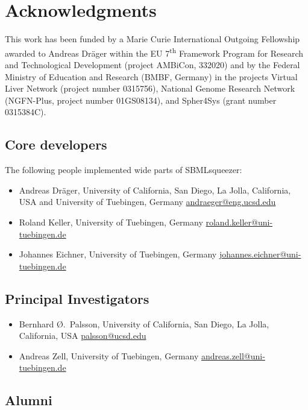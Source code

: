 \chapter{Acknowledgments}

This work has been funded by a Marie Curie International Outgoing Fellowship
awarded to Andreas Dr\"ager within the EU 7\textsuperscript{th} Framework
Program for Research and Technological Development (project AMBiCon, 332020) and
by the Federal Ministry of Education and Research (BMBF, Germany) in the
projects Virtual Liver Network (project number 0315756), National Genome
Research Network (NGFN-Plus, project number 01GS08134), and Spher4Sys (grant
number 0315384C).

\section{Core developers}

The following people implemented wide parts of SBMLsqueezer:
\begin{itemize}
\item Andreas Dr\"ager, 
  University of California, San Diego, La Jolla, California, USA and
  University of Tuebingen, Germany
  \href{mailto:andraeger@eng.ucsd.edu}{andraeger@eng.ucsd.edu}
\item Roland Keller,
  University of Tuebingen, Germany
  \href{mailto:roland.keller@uni-tuebingen.de}{roland.keller@uni-tuebingen.de}
\item Johannes Eichner,
  University of Tuebingen, Germany
  \href{mailto:johannes.eichner@uni-tuebingen.de}{johannes.eichner@uni-tuebingen.de}
\end{itemize}

\section{Principal Investigators}

\begin{itemize}
\item Bernhard \O.~Palsson,
  University of California, San Diego, La Jolla, California, USA
  \href{mailto:palsson@ucsd.edu}{palsson@ucsd.edu}
\item Andreas Zell, 
  University of Tuebingen, Germany
  \href{mailto:andreas.zell@uni-tuebingen.de}{andreas.zell@uni-tuebingen.de}
\end{itemize}

\section{Alumni}

